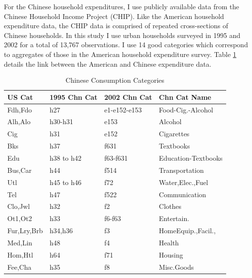 For the Chinese household expenditures, I use publicly available data from the Chinese Household Income Project (CHIP). \citep{CHIP2002} Like the American household expenditure data, the CHIP data is comprised of repeated cross-sections of Chinese households.  In this study I use urban households surveyed in 1995 and 2002 for a total of 13,767 observations.  I use 14 good categories which correspond to aggregates of those in the American household expenditure survey.   Table \ref{tab:chncons} details the link between the American and Chinese expenditure data.
\begin{table}
    \centering
    \footnotesize
 \begin{tabular}{llll}
        \hline \hline
        US Cat & 1995 Chn Cat & 2002 Chn Cat & Chn Cat Name  \\
        \hline 
        Fdh,Fdo     & h27        & e1-e152-e153 & Food-Cig.-Alcohol\\
        Alh,Alo     & h30-h31    & e153         & Alcohol\\
        Cig         & h31        & e152         & Cigarettes\\
        Bks         & h37        & f631         & Textbooks\\
        Edu         & h38 to h42 & f63-f631     & Education-Textbooks\\
        Bus,Car\footnotemark{}    & h44        & f514         & Transportation\\
        Utl         & h45 to h46 & f72          & Water,Elec.,Fuel\\
        Tel         & h47        & f522         & Communication\\
        Clo,Jwl     & h32        & f2           & Clothes\\
        Ot1,Ot2     & h33        & f6-f63       & Entertain.\\
        Fur,Lry,Brb & h34,h36    & f3           & HomeEquip.,Facil.,\\
        Med,Lin     & h48        & f4           & Health\\
        Hom,Htl     & h64        & f71          & Housing\\
        Fee,Cha     & h35        & f8           & Misc.Goods\\\hline
 \end{tabular}
    \caption{Chinese Consumption Categories}
    \label{tab:chncons}
\end{table}


